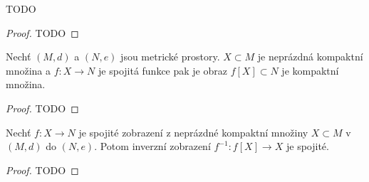\documentclass[../main.tex]{subfiles}
\begin{document}
\begin{lemma}
    TODO
\end{lemma}
\begin{proof}
    TODO
\end{proof}

\begin{lemma}
Nechť $(M,d)$ a $(N,e)$ jsou metrické prostory. $X \subset M$ je neprázdná
kompaktní množina a $f: X \to N$ je spojitá funkce pak je obraz $f[X] \subset N$
je kompaktní množina.
\end{lemma}
\begin{proof}
    TODO
\end{proof}

\begin{lemma}
    Nechť $f: X \to N$ je spojité zobrazení z neprázdné kompaktní množiny
    $X \subset M$ v $(M,d)$ do $(N,e)$. Potom inverzní zobrazení
    $f^{-1}: f[X] \to X$ je spojité.
\end{lemma}
\begin{proof}
    TODO
\end{proof}

\begin{definition}[Homeomorfismy]
    
\end{definition}

\begin{theorem}
    
\end{theorem}
\end{document}
